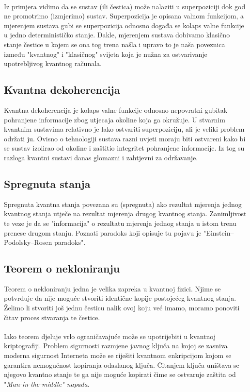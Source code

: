 \documentclass[times, utf8, zavrsni, numeric]{fer}
\begin{document}
\paragraph{}
Iz primjera vidimo da se sustav (ili čestica) može nalaziti u superpoziciji dok god ne promotrimo (izmjerimo) sustav. Superpozicija je opisana valnom funkcijom, a mjerenjem sustava gubi se superpozicija odnosno događa se kolaps valne funkcije u jedno determinističko stanje. Dakle, mjerenjem sustava dobivamo klasično stanje čestice u kojem se ona tog trena našla i upravo to je naša poveznica između "kvantnog" i "klasičnog" svijeta koja je nužna za ostvarivanje upotrebljivog kvantnog računala.

\subsection{Kvantna dekoherencija}
Kvantna dekoherencija je kolaps valne funkcije odnosno nepovratni gubitak pohranjene informacije zbog utjecaja okoline koja ga okružuje.
U stvarnim kvantnim sustavima relativno je lako ostvariti superpoziciju, ali je veliki problem održati ju. Ovisno o tehnologiji sustava razni uvjeti moraju biti ostvareni kako bi se sustav izolirao od okoline i zaštitio integritet pohranjene informacije. Iz tog su razloga kvantni sustavi danas glomazni i zahtjevni za održavanje.

\subsection{Spregnuta stanja}
Spregnuta kvantna stanja   povezana su (spregnuta) ako rezultat mjerenja jednog kvantnog stanja utječe na rezultat mjerenja drugog kvantnog stanja. Zanimljivost te veze je da se "informacija" o rezultatu mjerenja jednog stanja u istom trenu prenese drugom stanju. Poznati paradoks koji opisuje tu pojavu je "Einstein–Podolsky–Rosen paradoks".

\subsection{Teorem o nekloniranju}
Teorem o nekloniranju  jedna je velika zapreka u kvantnoj fizici. 
Njime se potvrđuje da nije moguće stvoriti identične kopije postojećeg kvantnog stanja. Želimo li stvoriti još jednu česticu nalik ovoj koju već imamo, moramo ponoviti čitav proces stvaranja te čestice. \cite{q_history}

\paragraph{}
Iako teorem djeluje vrlo ograničavajuće može se upotrijebiti u kvantnoj kriptografiji. Problem sigurnosti razmjene javnog ključa na kojoj se zasniva moderna sigurnost Interneta može se riješiti kvantnom enkripcijom kojom se garantira nemogućnost kopiranja odaslanog ključa. Čitanjem ključa uništava se njegovo kvantno stanje te ga nije moguće kopirati čime se ostvaruje zaštita od "\it Man-in-the-middle\rm" napada. \citep{han_phd}
\end{document}
